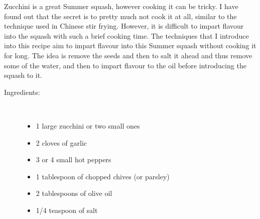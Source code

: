 \documentclass[11pt,letterpaper]{article}
\begin{document}


Zucchini is a great Summer squash, however cooking it can be tricky. I have found out that the secret is to pretty much not cook it at all, similar to the technique used in Chinese stir frying. However, it is difficult to impart flavour into the squash with such a brief cooking time. The techniques that I introduce into this recipe aim to impart flavour into this Summer squash without cooking it for long. The idea is remove the seeds and then to salt it ahead and thus remove some of the water, and then to impart flavour to the oil before introducing the squash to it. 

\begin{description}

\item[Ingredients:]\ \\
	\begin{itemize}
	\item 1 large zucchini or two small ones
	\item 2 cloves of garlic
	\item 3 or 4 small hot peppers
	\item 1 tablespoon of chopped chives (or parsley)
	\item 2 tablespoons of olive oil
	\item 1/4 teaspoon of salt
	\end{itemize}


\end{description}
\end{document}
